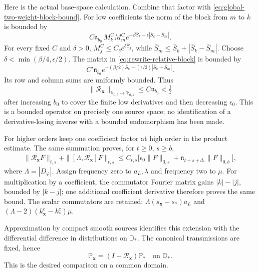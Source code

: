 Here is the actual base-space calculation. Combine that factor with
\eqref{eq:global-two-weight-block-bound}. For low coefficients the
norm of the block from $m$ to $k$ is bounded by
\begin{equation}\label{eq:rewrite-relative-block}
 C\mathfrak n_{b_0}\,M_k^CM_m^C
            e^{-\beta\bar S_k-\epsilon|\bar S_k-\bar S_m|}.
\end{equation}
For every fixed $C$ and $\delta>0$,
$M_j^C\le C_\delta e^{\delta\bar S_j}$, while
$\bar S_m\le\bar S_k+|\bar S_k-\bar S_m|$.
Choose $\delta<\min(\beta/4,\epsilon/2)$. The matrix in
\eqref{eq:rewrite-relative-block} is bounded by
\[
 C'\mathfrak n_{b_0}
       e^{-(\beta/2)\bar S_k-(\epsilon/2)|\bar S_k-\bar S_m|}.
\]
Its row and column sums are uniformly bounded. Thus
\begin{equation}\label{eq:rewrite-base-relative}
 \|\mathscr R_{\mathbf x}\|_{\mathbb V_{0,b}\to\mathbb V_{0,b}}
                         \le C\mathfrak n_{b_0}<\tfrac12
\end{equation}
after increasing $b_0$ to cover the finite low derivatives and
then decreasing $\epsilon_0$. This is a bounded operator on precisely
one source space; no identification of a derivative-losing inverse
with a bounded endomorphism has been made.

For higher orders keep one coefficient factor at high order in the
product estimate. The same summation proves, for $t\ge0$, $s\ge b$,
\begin{equation}\label{eq:compact-volume-relative-bound}
 \begin{split}
 \|\mathscr R_{\mathbf x}F\|_{t,s}
 +\|[\Lambda,\mathscr R_{\mathbf x}]F\|_{t,s}
 \le C_{t,s}\bigl[\epsilon_0\|F\|_{0,s}
             +\mathfrak n_{t+s+d_*}\|F\|_{0,b}\bigr],
 \end{split}
\end{equation}
where $\Lambda=|D_\varphi|$. Assign frequency zero to $a_L,\lambda$
and frequency two to $\mu$. For multiplication by a coefficient,
the commutator Fourier matrix gains $|k|-|j|$, bounded by $|k-j|$;
one additional coefficient derivative therefore proves the same bound.
The scalar commutators are retained:
$\Lambda(s_{\mathbf x}-s_*)a_L$ and
$(\Lambda-2)(k_{\mathbf x}^c-k_*^c)\mu$.

Approximation by compact smooth sources identifies this extension
with the differential difference in distributions on $\mathbb D_*$.
The canonical transmissions are fixed, hence
\begin{equation}\label{eq:current-fixed-domain-factorization}
 \mathbb P_{\mathbf x}=(I+\mathscr R_{\mathbf x})\mathbb P_*
                         \quad\text{on }\mathbb D_*.
\end{equation}
This is the desired comparison on a common domain.

